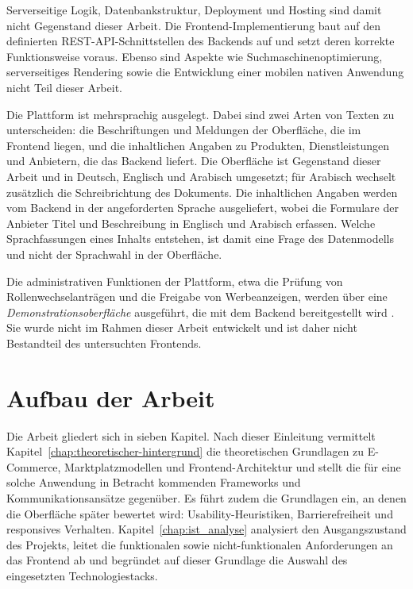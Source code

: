 Serverseitige Logik, Datenbankstruktur, Deployment und Hosting
sind damit nicht Gegenstand dieser Arbeit. Die
Frontend-Implementierung baut auf den definierten
\acs{REST}-API-Schnittstellen des Backends auf und setzt deren
korrekte Funktionsweise voraus. Ebenso sind Aspekte wie
Suchmaschinenoptimierung, serverseitiges Rendering sowie
die Entwicklung einer mobilen nativen Anwendung nicht Teil
dieser Arbeit.

Die Plattform ist mehrsprachig ausgelegt. Dabei sind zwei Arten von
Texten zu unterscheiden: die Beschriftungen und Meldungen der
Oberfläche, die im Frontend liegen, und die inhaltlichen Angaben zu
Produkten, Dienstleistungen und Anbietern, die das Backend liefert.
Die Oberfläche ist Gegenstand dieser Arbeit und in Deutsch, Englisch
und Arabisch umgesetzt; für Arabisch wechselt zusätzlich die
Schreibrichtung des Dokuments. Die inhaltlichen Angaben werden vom
Backend in der angeforderten Sprache ausgeliefert, wobei die Formulare
der Anbieter Titel und Beschreibung in Englisch und Arabisch erfassen. Welche
Sprachfassungen eines Inhalts entstehen, ist damit eine Frage des
Datenmodells und nicht der Sprachwahl in der Oberfläche.

Die administrativen Funktionen der Plattform, etwa die Prüfung von
Rollenwechselanträgen und die Freigabe von Werbeanzeigen, werden über
eine \emph{Demonstrationsoberfläche} ausgeführt, die mit dem Backend
bereitgestellt wird \cite{alaatki_backend}. Sie wurde nicht im Rahmen
dieser Arbeit entwickelt und ist daher nicht Bestandteil des
untersuchten Frontends.

\section{Aufbau der Arbeit}
\label{sec:aufbau}

Die Arbeit gliedert sich in sieben Kapitel. Nach dieser
Einleitung vermittelt Kapitel~\ref{chap:theoretischer-hintergrund}
die theoretischen Grundlagen zu E-Commerce, Marktplatzmodellen und
Frontend-Architektur und stellt die für eine solche Anwendung in
Betracht kommenden Frameworks und Kommunikationsansätze
gegenüber. Es führt zudem die Grundlagen ein, an denen die Oberfläche
später bewertet wird: Usability-Heuristiken, Barrierefreiheit und
responsives Verhalten. Kapitel~\ref{chap:ist_analyse} analysiert den
Ausgangszustand des Projekts, leitet die funktionalen sowie
nicht-funktionalen Anforderungen an das Frontend ab und begründet
auf dieser Grundlage die Auswahl des eingesetzten Technologiestacks.

